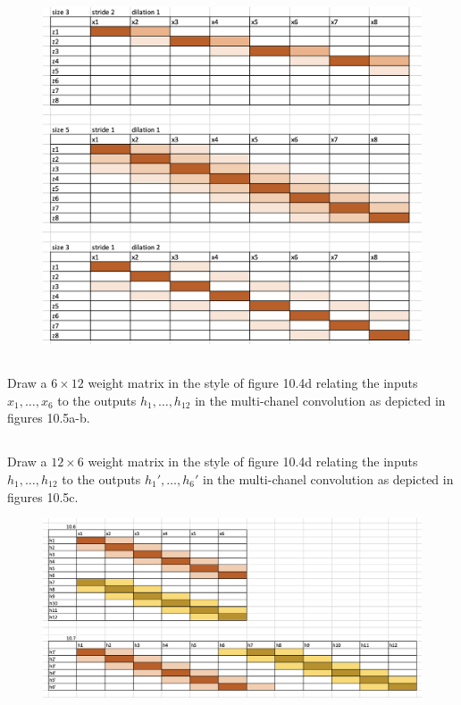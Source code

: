 \documentclass[12pt]{report}
\begin{document}
\begin{figure}[h]
    \centering
    \includegraphics[width=\textwidth]{10_5.png}
    \label{fig:udl_chap10_fig1}
\end{figure}

\subsection{}
\begin{mdframed}
    Draw a $6 \times 12$ weight matrix in the style of figure 10.4d relating the inputs $x_{1}, \dots, x_{6}$ to the outputs $h_{1}, \dots, h_{12}$ in the multi-chanel convolution as depicted in figures 10.5a-b.
\end{mdframed}

\subsection{}
\begin{mdframed}
    Draw a $12 \times 6$ weight matrix in the style of figure 10.4d relating the inputs $h_{1}, \dots, h_{12}$ to the outputs $h_{1}', \dots, h_{6}'$ in the multi-chanel convolution as depicted in figures 10.5c.
\end{mdframed}

\begin{figure}[ht]
    \centering
    \includegraphics[width=1\textwidth]{10_6_7.png}
    \label{fig:udl_chap10_fig2}
\end{figure}
\end{document}
